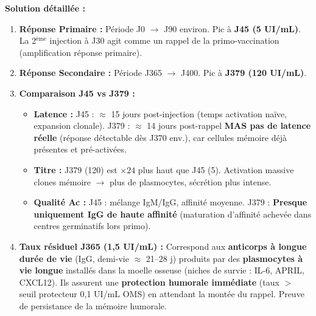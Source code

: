 \documentclass[11pt]{article}
\begin{document}
\begin{exoresolu}
\tcblower
\textbf{Solution détaillée :}
\begin{enumerate}
    \item \textbf{Réponse Primaire :} Période J0 $\to$ J90 environ. Pic à \textbf{J45 (5 UI/mL)}. La 2$^{\text{ème}}$ injection à J30 agit comme un rappel de la primo-vaccination (amplification réponse primaire).
    \item \textbf{Réponse Secondaire :} Période J365 $\to$ J400. Pic à \textbf{J379 (120 UI/mL)}.
    \item \textbf{Comparaison J45 vs J379 :}
    \begin{itemize}
        \item \textbf{Latence :} J45 : $\approx$ 15 jours post-injection (temps activation naïve, expansion clonale). J379 : $\approx$ 14 jours post-rappel \textbf{MAS pas de latence réelle} (réponse détectable dès J370 env.), car cellules mémoire déjà présentes et pré-activées.
        \item \textbf{Titre :} J379 (120) est $\times 24$ plus haut que J45 (5). Activation massive clones mémoire $\to$ plus de plasmocytes, sécrétion plus intense.
        \item \textbf{Qualité Ac :} J45 : mélange IgM/IgG, affinité moyenne. J379 : \textbf{Presque uniquement IgG de haute affinité} (maturation d'affinité achevée dans centres germinatifs lors primo).
    \end{itemize}
    \item \textbf{Taux résiduel J365 (1,5 UI/mL) :} Correspond aux \textbf{anticorps à longue durée de vie} (IgG, demi-vie $\approx$ 21--28 j) produits par des \textbf{plasmocytes à vie longue} installés dans la moelle osseuse (niches de survie : IL-6, APRIL, CXCL12). Ils assurent une \textbf{protection humorale immédiate} (taux $>$ seuil protecteur 0,1 UI/mL OMS) en attendant la montée du rappel. Preuve de persistance de la mémoire humorale.
\end{enumerate}
\end{exoresolu}
\end{document}
